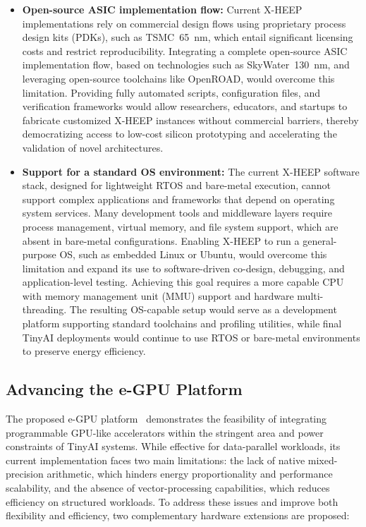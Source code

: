             \vspace{-1em}
            \begin{itemize}
                \item \textbf{Open-source ASIC implementation flow:} Current \mbox{X-HEEP} implementations rely on commercial design flows using proprietary process design kits (PDKs), such as \mbox{TSMC}~\SI{65}{\nano\meter}, which entail significant licensing costs and restrict reproducibility. Integrating a complete open-source ASIC implementation flow, based on technologies such as \mbox{SkyWater}~\SI{130}{\nano\meter}, and leveraging open-source toolchains like OpenROAD, would overcome this limitation. Providing fully automated scripts, configuration files, and verification frameworks would allow researchers, educators, and startups to fabricate customized \mbox{X-HEEP} instances without commercial barriers, thereby democratizing access to low-cost silicon prototyping and accelerating the validation of novel architectures.
            
                \item \textbf{Support for a standard OS environment:} The current \mbox{X-HEEP} software stack, designed for lightweight RTOS and bare-metal execution, cannot support complex applications and frameworks that depend on operating system services. Many development tools and middleware layers require process management, virtual memory, and file system support, which are absent in bare-metal configurations. Enabling \mbox{X-HEEP} to run a general-purpose OS, such as embedded Linux or Ubuntu, would overcome this limitation and expand its use to software-driven co-design, debugging, and application-level testing. Achieving this goal requires a more capable CPU with memory management unit (MMU) support and hardware multi-threading. The resulting OS-capable setup would serve as a development platform supporting standard toolchains and profiling utilities, while final TinyAI deployments would continue to use RTOS or bare-metal environments to preserve energy efficiency.
            \end{itemize}
            \vspace{-1em}
        
        \subsection{Advancing the e-GPU Platform}
        
            The proposed \mbox{e-GPU} platform~\cite{e-gpu} demonstrates the feasibility of integrating programmable GPU-like accelerators within the stringent area and power constraints of TinyAI systems. While effective for data-parallel workloads, its current implementation faces two main limitations: the lack of native mixed-precision arithmetic, which hinders energy proportionality and performance scalability, and the absence of vector-processing capabilities, which reduces efficiency on structured workloads. To address these issues and improve both flexibility and efficiency, two complementary hardware extensions are proposed:
        
